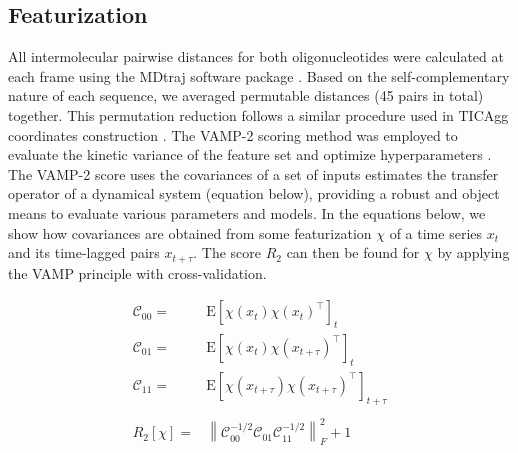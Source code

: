 \documentclass[journal=jpcbfk,manuscript=article]{achemso}
\newcommand{\Expect}[1]{\mathrm{E}\left[#1\right]}
\newcommand{\norm}[1]{\left\lVert#1\right\rVert}
\begin{document}
\subsection{\label{sec:methods}Featurization}

All intermolecular pairwise distances for both oligonucleotides were calculated at each frame using the MDtraj software package \citep{McGibbon2015MDTraj:Trajectories}. Based on the self-complementary nature of each sequence, we averaged permutable distances (45 pairs in total) together. This permutation reduction follows a similar procedure used in TICAgg coordinates construction \citep{Sengupta2019AutomatedSelf-assembly}. The VAMP-2 scoring method was employed to evaluate the kinetic variance of the feature set and optimize hyperparameters \citep{WuVariationalData, Mardt2018VAMPnetsKinetics}. The VAMP-2 score uses the covariances of a set of inputs estimates the transfer operator of a dynamical system (equation below), providing a robust and object means to evaluate various parameters and models. In the equations below, we show how covariances are obtained from some featurization $\chi$ of a time series $x_t$ and its time-lagged pairs $x_{t+\tau}$. The score $R_2$ can then be found for $\chi$ by applying the VAMP principle with cross-validation.

\begin{align*}
 	\mathscr{C}_{00}=&\Expect{\chi(x_t)\chi(x_t)^\intercal}_t\\
 	\mathscr{C}_{01}=&\Expect{\chi(x_t)\chi(x_{t+\tau})^\intercal}_t\\
 	\mathscr{C}_{11}=&\Expect{\chi(x_{t+\tau})\chi(x_{t+\tau})^\intercal}_{t+\tau}\\
	\\
 	R_2[\chi]=&\norm{\mathscr{C}_{00}^{-1/2}\mathscr{C}_{01}\mathscr{C}_{11}^{-1/2}}_F^2 +1
\end{align*}\label{CK1}

\end{document}
